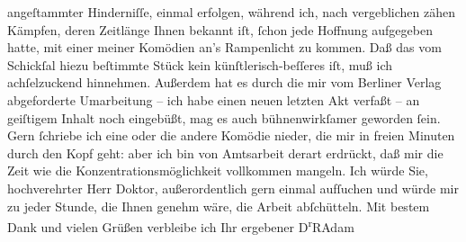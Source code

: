 \begin{ledgroupsized}[t]{13cm}
               angeſtammter Hinderniſſe, einmal erfolgen, während ich, nach vergeblichen zähen
               Kämpfen, deren Zeitlänge Ihnen bekannt iſt, ſchon jede Hoffnung aufgegeben hatte, mit
               einer meiner Komödien an’s Rampenlicht zu kommen. Daß das vom Schickſal hiezu
               beſtimmte Stück kein
               künſtlerisch-beſſeres iſt, muß ich achſelzuckend hinnehmen. Außerdem hat es durch die
               mir vom Berliner Verlag abgeforderte Umarbeitung – ich habe einen neuen
               letzten Akt verfaßt – an geiſtigem Inhalt noch eingebüßt, mag es auch bühnenwirkſamer
               geworden ſein.\pend
           \pstart
           Gern ſchriebe ich eine oder die andere Komödie {\pb}nieder, die mir in freien Minuten durch
               den Kopf geht: aber ich bin von Amtsarbeit derart erdrückt, daß mir die Zeit wie die
               Konzentrationsmöglichkeit vollkommen mangeln.\pend
           \pstart
           Ich würde Sie, hochverehrter Herr Doktor, außerordentlich gern einmal aufſuchen und
               würde mir zu jeder Stunde, die Ihnen genehm wäre, die Arbeit abſchütteln.\pend
           \pstart
           Mit bestem Dank und vielen Grüßen verbleibe ich Ihr ergebener\pend
           \pstart \spacefill\mbox{D\textsuperscript{r}RAdam}\pend{}
         
         \endnumbering{}\end{ledgroupsized}  \newcommand{\dateiname}{L02538}\newcommand{\titel}{Robert Adam an Arthur Schnitzler, 15. 6. 1930}\newcommand{\editorInnen}{Martin Anton Müller und Gerd-Hermann Susen}
      
